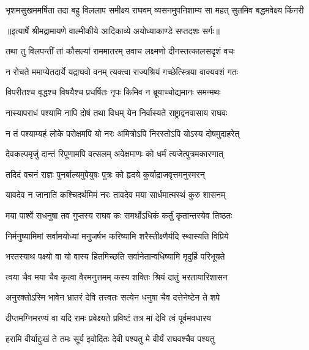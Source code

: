 \fourlineindentedshloka
{भृशमसुखममर्षिता तदा}
{बहु विललाप समीक्ष्य राघवम्}
{व्यसनमुपनिशाम्य सा महत्}
{सुतमिव बद्धमवेक्ष्य किंनरी} %


{॥इत्यार्षे श्रीमद्रामायणे वाल्मीकीये आदिकाव्ये अयोध्याकाण्डे सप्तदशः सर्गः॥}


\twolineshloka
{तथा तु विलपन्तीं तां कौसल्यां राममातरम्}
{उवाच लक्ष्मणो दीनस्तत्कालसदृशं वचः} %

\twolineshloka
{न रोचते ममाप्येतदार्ये यद्राघवो वनम्}
{त्यक्त्वा राज्यश्रियं गच्छेत्स्त्रिया वाक्यवशं गतः} %

\twolineshloka
{विपरीतश्च वृद्धश्च विषयैश्च प्रधर्षितः}
{नृपः किमिव न ब्रूयाच्चोद्यमानः समन्मथः} %

\twolineshloka
{नास्यापराधं पश्यामि नापि दोषं तथा विधम्}
{येन निर्वास्यते राष्ट्राद्वनवासाय राघवः} %

\twolineshloka
{न तं पश्याम्यहं लोके परोक्षमपि यो नरः}
{अमित्रोऽपि निरस्तोऽपि योऽस्य दोषमुदाहरेत्} %

\twolineshloka
{देवकल्पमृजुं दान्तं रिपूणामपि वत्सलम्}
{अवेक्षमाणः को धर्मं त्यजेत्पुत्रमकारणात्} %

\twolineshloka
{तदिदं वचनं राज्ञः पुनर्बाल्यमुपेयुषः}
{पुत्रः को हृदये कुर्याद्राजवृत्तमनुस्मरन्} %

\twolineshloka
{यावदेव न जानाति कश्चिदर्थमिमं नरः}
{तावदेव मया सार्धमात्मस्थं कुरु शासनम्} %

\twolineshloka
{मया पार्श्वे सधनुषा तव गुप्तस्य राघव}
{कः समर्थोऽधिकं कर्तुं कृतान्तस्येव तिष्ठतः} %

\twolineshloka
{निर्मनुष्यामिमां सर्वामयोध्यां मनुजर्षभ}
{करिष्यामि शरैस्तीक्ष्णैर्यदि स्थास्यति विप्रिये} %

\twolineshloka
{भरतस्याथ पक्ष्यो वा यो वास्य हितमिच्छति}
{सर्वानेतान्वधिष्यामि मृदुर्हि परिभूयते} %

\twolineshloka
{त्वया चैव मया चैव कृत्वा वैरमनुत्तमम्}
{कस्य शक्तिः श्रियं दातुं भरतायारिशासन} %

\twolineshloka
{अनुरक्तोऽस्मि भावेन भ्रातरं देवि तत्त्वतः}
{सत्येन धनुषा चैव दत्तेनेष्टेन ते शपे} %

\twolineshloka
{दीप्तमग्निमरण्यं वा यदि रामः प्रवेक्ष्यते}
{प्रविष्टं तत्र मां देवि त्वं पूर्वमवधारय} %

\twolineshloka
{हरामि वीर्याद्दुःखं ते तमः सूर्य इवोदितः}
{देवी पश्यतु मे वीर्यं राघवश्चैव पश्यतु} %

